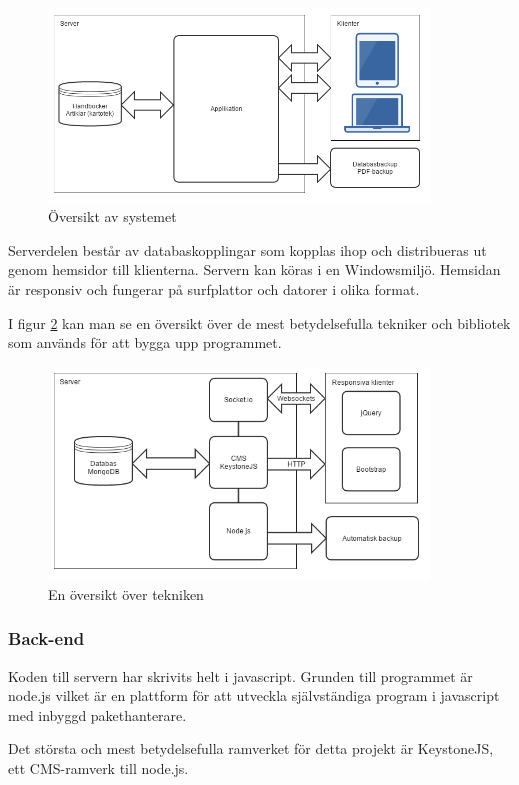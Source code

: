 \begin{figure}[htbp]
  \centering
  \includegraphics[width=0.9\textwidth]{images/overview.png}
  \caption{Översikt av systemet}
  \label{fig:overview}
\end{figure}
Serverdelen består av databaskopplingar som kopplas ihop och distribueras ut genom hemsidor till klienterna. Servern kan köras i en Windowsmiljö. Hemsidan är responsiv och fungerar på surfplattor och datorer i olika format.


I figur \ref{fig:techoverview} kan man se en översikt över de mest betydelsefulla tekniker och bibliotek som används för att bygga upp programmet.
\begin{figure}
  \centering
  \includegraphics[width=0.9\textwidth]{images/techoverview.png}
  \caption{En översikt över tekniken}
  \label{fig:techoverview}
\end{figure}
\subsubsection{Back-end}
Koden till servern har skrivits helt i javascript.
Grunden till programmet är node.js vilket är en plattform för att utveckla självständiga program i javascript med inbyggd pakethanterare.

Det största och mest betydelsefulla ramverket för detta projekt är KeystoneJS, ett CMS-ramverk till node.js.

